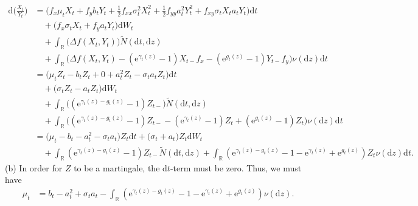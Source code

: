 \documentclass[12pt]{book}
\numberwithin{equation}{chapter}
\theoremstyle{plain}
\numberwithin{theorem}{section}
\theoremstyle{definition}
\numberwithin{exercise}{chapter}
\newcommand{\<}{\langle}
\renewcommand{\>}{\rangle}
\renewcommand{\(}{\left(}
\renewcommand{\)}{\right)}
\renewcommand{\[}{\left[}
\renewcommand{\]}{\right]}
\newcommand\Rb{\mathds{R}}
\newcommand\sig{\sigma}
\newcommand\gam{\gamma}
\newcommand\Del{\Delta}
\newcommand\Nt{\widetilde{N}}
\newcommand\dd{\mathrm{d}}
\newcommand\ee{\mathrm{e}}
\begin{document}
\begin{align}
\dd \Big( \frac{X_t}{Y_t} \Big)
	&=	\Big( f_x \mu_t X_t + f_y b_t Y_t + \tfrac{1}{2} f_{xx} \sig_t^2 X_t^2 + \tfrac{1}{2} f_{yy} a_t^2 Y_t^2 + f_{xy} \sig_t X_t a_t Y_t \Big) \dd t \\ & \quad
			+ \Big( f_x \sig_t X_t + f_y a_t Y_t \Big) \dd W_t \\ & \quad
			+ \int_\Rb \Big( \Del f(X_t,Y_t) \Big) \Nt(\dd t, \dd z) \\ & \quad
			+ \int_\Rb \Big( \Del f(X_t,Y_t) - (\ee^{\gam_t(z)}-1) X_{t-} f_x - (\ee^{g_t(z)}-1) Y_{t-} f_y \Big) \nu(\dd z)\dd t \\ 
	&=	\Big( \mu_t Z_t - b_t Z_t + 0 + a_t^2 Z_t - \sig_t a_t Z_t \Big) \dd t \\ & \quad
			+ \Big( \sig_t Z_t - a_t Z_t \Big) \dd W_t \\ & \quad
			+ \int_\Rb \Big( (\ee^{\gam_t(z)-g_t(z)} - 1 )Z_{t-} \Big) \Nt(\dd t, \dd z) \\ & \quad
			+ \int_\Rb \Big( (\ee^{\gam_t(z)-g_t(z)} - 1 )Z_{t-} - (\ee^{\gam_t(z)}-1) Z_t + (\ee^{g_t(z)}-1) Z_t \Big) \nu(\dd z) \dd t \\
	&=  \Big( \mu_t - b_t - a_t^2  - \sig_t a_t \Big) Z_t \dd t 
			+ \Big( \sig_t + a_t \Big) Z_t \dd W_t \\ & \quad
			+ \int_\Rb ( \ee^{\gam_t(z)-g_t(z)} - 1 )Z_{t-} \Nt(\dd t, \dd z) 
			+ \int_\Rb ( \ee^{\gam_t(z)-g_t(z)} - 1 - \ee^{\gam_t(z)}+ \ee^{g_t(z)} ) Z_t \nu(\dd z) \dd t .
\end{align}
(b) In order for $Z$ to be a martingale, the $\dd t$-term must be zero.  Thus, we must have
\begin{align}
\mu_t
	&=	b_t - a_t^2  + \sig_t a_t - \int_\Rb ( \ee^{\gam_t(z)-g_t(z)} - 1 - \ee^{\gam_t(z)}+ \ee^{g_t(z)} ) \nu(\dd z) .
\end{align}
\end{document}
